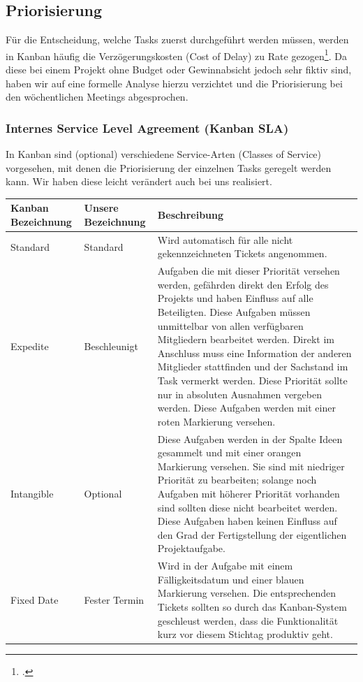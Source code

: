 \subsection{Priorisierung}
\label{subsec:priorisierung}
Für die Entscheidung, welche Tasks zuerst durchgeführt werden müssen, werden in Kanban häufig die Verzögerungskosten (Cost of Delay) zu Rate gezogen\footcite{wikiKanban}. Da diese bei einem Projekt ohne Budget oder Gewinnabsicht jedoch sehr fiktiv sind, haben wir auf eine formelle Analyse hierzu verzichtet und die Priorisierung bei den wöchentlichen Meetings abgesprochen.

\subsubsection{Internes Service Level Agreement (Kanban SLA)}
In Kanban sind (optional) verschiedene Service-Arten (Classes of Service) vorgesehen, mit denen die Priorisierung der einzelnen Tasks geregelt werden kann. Wir haben diese leicht verändert auch bei uns realisiert.

\begin{minipage}{\textwidth}
\begin{center}
\begin{tabular}{p{2.2cm}p{2.4cm}p{10.8cm}}
\toprule
Kanban \newline Bezeichnung & Unsere \newline Bezeichnung & Beschreibung \\
\midrule
Standard & Standard & Wird automatisch für alle nicht gekennzeichneten Tickets angenommen. \\
Expedite & Beschleunigt & Aufgaben die mit dieser Priorität versehen werden, gefährden direkt den Erfolg des Projekts und haben Einfluss auf alle Beteiligten. Diese Aufgaben müssen unmittelbar von allen verfügbaren Mitgliedern bearbeitet werden. Direkt im Anschluss muss eine Information der anderen Mitglieder stattfinden und der Sachstand im Task vermerkt werden. Diese Priorität sollte nur in absoluten Ausnahmen vergeben werden. Diese Aufgaben werden mit einer roten Markierung versehen. \\
Intangible & Optional & Diese Aufgaben werden in der Spalte Ideen gesammelt und mit einer orangen Markierung versehen. Sie sind mit niedriger Priorität zu bearbeiten; solange noch Aufgaben mit höherer Priorität vorhanden sind sollten diese nicht bearbeitet werden. Diese Aufgaben haben keinen Einfluss auf den Grad der Fertigstellung der eigentlichen Projektaufgabe.\\
Fixed Date & Fester \newline Termin & Wird in der Aufgabe mit einem Fälligkeitsdatum und einer blauen Markierung versehen. Die entsprechenden Tickets sollten so durch das Kanban-System geschleust werden, dass die Funktionalität kurz vor diesem Stichtag produktiv geht. \\
\bottomrule
\end{tabular}
\end{center}
\end{minipage}

